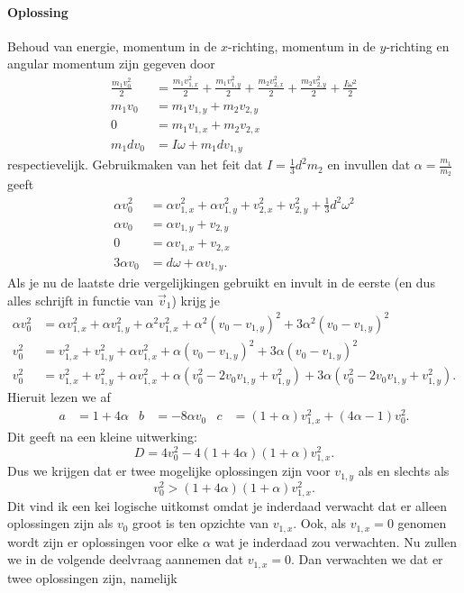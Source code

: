\documentclass[11pt]{article}
\begin{document}
\paragraph{Oplossing}
Behoud van energie, momentum in de $x$-richting, momentum in de $y$-richting en angular momentum zijn gegeven door
\begin{align}
	\frac{m_1 v_0^2}{2}&=\frac{m_1v_{1,x}^2}{2}+\frac{m_1v_{1,y}^2}{2}+\frac{m_2v_{2,x}^2}{2}+\frac{m_2v_{2,y}^2}{2}+\frac{I\omega^2}{2}\\
	m_1v_0&=m_1v_{1,y}+m_2v_{2,y}\\
	0&=m_1v_{1,x}+m_2v_{2,x}\\
	m_1dv_0&=I\omega+m_1dv_{1,y}
\end{align}
respectievelijk. Gebruikmaken van het feit dat $I=\frac{1}{3}d^2m_2$ en invullen dat $\alpha=\frac{m_1}{m_2}$ geeft
\begin{align}
	\alpha v_0^2&=\alpha v_{1,x}^2+\alpha v_{1,y}^2+v_{2,x}^2+v_{2,y}^2+\frac{1}{3}d^2\omega^2\\
	\alpha v_0&=\alpha v_{1,y}+v_{2,y}\\
	0&=\alpha v_{1,x}+v_{2,x}\\
	3\alpha v_0&=d\omega+\alpha v_{1,y}.
\end{align}
Als je nu de laatste drie vergelijkingen gebruikt en invult in de eerste (en dus alles schrijft in functie van $\vec{v}_1$) krijg je
\begin{align}
	\alpha v_0^2&=\alpha v_{1,x}^2+\alpha v_{1,y}^2+\alpha^2 v_{1,x}^2+\alpha^2(v_0-v_{1,y})^2+3\alpha^2(v_0-v_{1,y})^2\\
	v_0^2&=v_{1,x}^2+v_{1,y}^2+\alpha v_{1,x}^2+\alpha(v_0-v_{1,y})^2+3\alpha(v_0-v_{1,y})^2\\
	v_0^2&=v_{1,x}^2+v_{1,y}^2+\alpha v_{1,x}^2+\alpha(v_0^2-2v_0v_{1,y}+v_{1,y}^2)+3\alpha(v_0^2-2v_0v_{1,y}+v_{1,y}^2).
\end{align}
Hieruit lezen we af
\begin{align}
	a&=1+4\alpha&b&=-8\alpha v_0&c&=(1+\alpha)v_{1,x}^2+(4\alpha-1)v_0^2.
\end{align}
Dit geeft na een kleine uitwerking:
\begin{equation}
	D=4v_0^2-4(1+4\alpha)(1+\alpha)v_{1,x}^2.
\end{equation}
Dus we krijgen dat er twee mogelijke oplossingen zijn voor $v_{1,y}$ als en slechts als
\begin{equation}
	v_0^2>(1+4\alpha)(1+\alpha)v_{1,x}^2.
\end{equation}
Dit vind ik een kei logische uitkomst omdat je inderdaad verwacht dat er alleen oplossingen zijn als $v_0$ groot is ten opzichte van $v_{1,x}$. Ook, als $v_{1,x}=0$ genomen wordt zijn er oplossingen voor elke $\alpha$ wat je inderdaad zou verwachten. Nu zullen we in de volgende deelvraag aannemen dat $v_{1,x}=0$. Dan verwachten we dat er twee oplossingen zijn, namelijk
\end{document}
